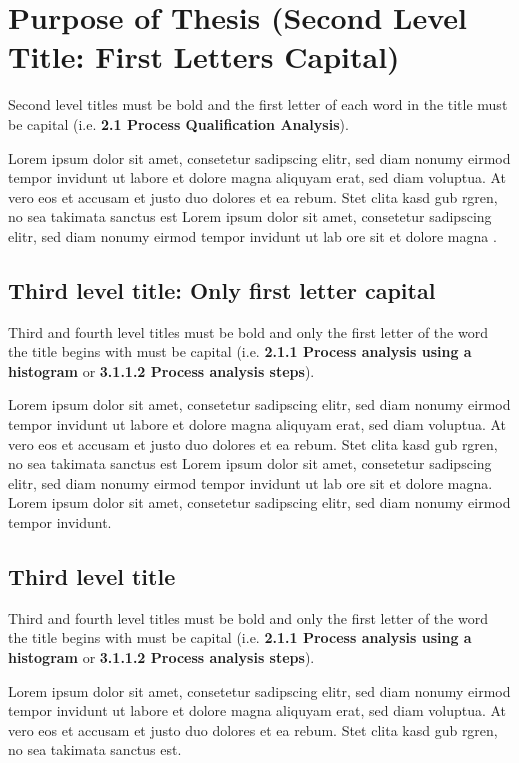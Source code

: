 \section{Purpose of Thesis (Second Level Title: First Letters Capital)}\label{purposeofthesis}

Second level titles must be bold and the first letter of each word in the title must be capital (i.e. \textbf{2.1 Process Qualification Analysis}).

Lorem ipsum dolor sit amet, consetetur sadipscing elitr, sed diam nonumy eirmod tempor invidunt ut labore et dolore magna aliquyam erat, sed diam voluptua. At vero eos et accusam et justo duo dolores et ea rebum. Stet clita kasd gub rgren, no sea takimata sanctus est Lorem ipsum dolor sit amet, consetetur sadipscing elitr, sed diam nonumy eirmod tempor invidunt ut lab ore sit et dolore magna \cite{Cutler2015}.

\subsection{Third level title: Only first letter capital}

Third and fourth level titles must be bold and only the first letter of the word the title begins with must be capital (i.e. \textbf{2.1.1 Process analysis using a histogram} or \textbf{3.1.1.2 Process analysis steps}).

Lorem ipsum dolor sit amet, consetetur sadipscing elitr, sed diam nonumy eirmod tempor invidunt ut labore et dolore magna aliquyam erat, sed diam voluptua. At vero eos et accusam et justo duo dolores et ea rebum. Stet clita kasd gub rgren, no sea takimata sanctus est Lorem ipsum dolor sit amet, consetetur sadipscing elitr, sed diam nonumy eirmod tempor invidunt ut lab ore sit et dolore magna. Lorem ipsum dolor sit amet, consetetur sadipscing elitr, sed diam nonumy eirmod tempor invidunt.

\subsection{Third level title}

Third and fourth level titles must be bold and only the first letter of the word the title begins with must be capital (i.e. \textbf{2.1.1 Process analysis using a histogram} or \textbf{3.1.1.2 Process analysis steps}).

Lorem ipsum dolor sit amet, consetetur sadipscing elitr, sed diam nonumy eirmod tempor invidunt ut labore et dolore magna aliquyam erat, sed diam voluptua. At vero eos et accusam et justo duo dolores et ea rebum. Stet clita kasd gub rgren, no sea takimata sanctus est.

